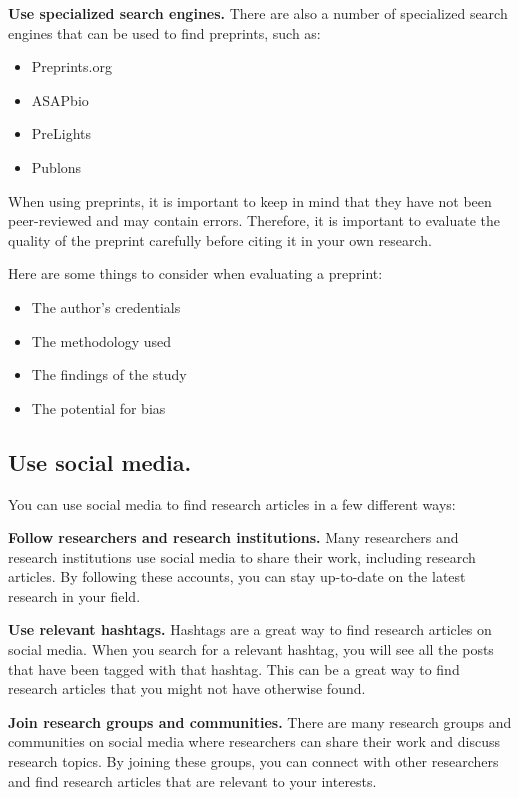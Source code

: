 \documentclass[
  b5paper]{book}
\begin{document}
\textbf{Use specialized search engines.} There are also a number of specialized search engines that can be used to find preprints, such as:

\begin{itemize}
\item
  Preprints.org
\item
  ASAPbio
\item
  PreLights
\item
  Publons
\end{itemize}

When using preprints, it is important to keep in mind that they have not been peer-reviewed and may contain errors. Therefore, it is important to evaluate the quality of the preprint carefully before citing it in your own research.

Here are some things to consider when evaluating a preprint:

\begin{itemize}
\item
  The author's credentials
\item
  The methodology used
\item
  The findings of the study
\item
  The potential for bias
\end{itemize}

\hypertarget{use-social-media.}{%
\subsection*{Use social media.}\label{use-social-media.}}

You can use social media to find research articles in a few different ways:

\textbf{Follow researchers and research institutions.} Many researchers and research institutions use social media to share their work, including research articles. By following these accounts, you can stay up-to-date on the latest research in your field.

\textbf{Use relevant hashtags.} Hashtags are a great way to find research articles on social media. When you search for a relevant hashtag, you will see all the posts that have been tagged with that hashtag. This can be a great way to find research articles that you might not have otherwise found.

\textbf{Join research groups and communities.} There are many research groups and communities on social media where researchers can share their work and discuss research topics. By joining these groups, you can connect with other researchers and find research articles that are relevant to your interests.
\end{document}
